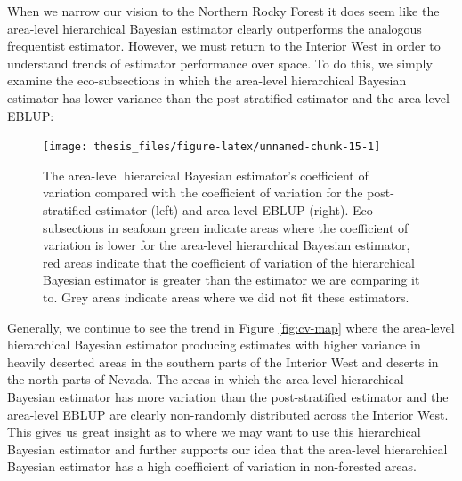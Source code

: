\documentclass[12pt,twoside]{reedthesis}
\begin{document}
When we narrow our vision to the Northern Rocky Forest it does seem like the area-level hierarchical Bayesian estimator clearly outperforms the analogous frequentist estimator. However, we must return to the Interior West in order to understand trends of estimator performance over space. To do this, we simply examine the eco-subsections in which the area-level hierarchical Bayesian estimator has lower variance than the post-stratified estimator and the area-level EBLUP:
\begin{figure}

{\centering \texttt{[image: thesis\_files/figure-latex/unnamed-chunk-15-1]} 

}

\caption[Area-level coefficient of variation comparison across the Interior West]{The area-level hierarcical Bayesian estimator's coefficient of variation compared with the coefficient of variation for the post-stratified estimator (left) and area-level EBLUP (right). Eco-subsections in seafoam green indicate areas where the coefficient of variation is lower for the area-level hierarchical Bayesian estimator, red areas indicate that the coefficient of variation of the hierarchical Bayesian estimator is greater than the estimator we are comparing it to. Grey areas indicate areas where we did not fit these estimators.}\label{fig:unnamed-chunk-15}
\end{figure}
Generally, we continue to see the trend in Figure \ref{fig:cv-map} where the area-level hierarchical Bayesian estimator producing estimates with higher variance in heavily deserted areas in the southern parts of the Interior West and deserts in the north parts of Nevada. The areas in which the area-level hierarchical Bayesian estimator has more variation than the post-stratified estimator and the area-level EBLUP are clearly non-randomly distributed across the Interior West. This gives us great insight as to where we may want to use this hierarchical Bayesian estimator and further supports our idea that the area-level hierarchical Bayesian estimator has a high coefficient of variation in non-forested areas.
\end{document}
